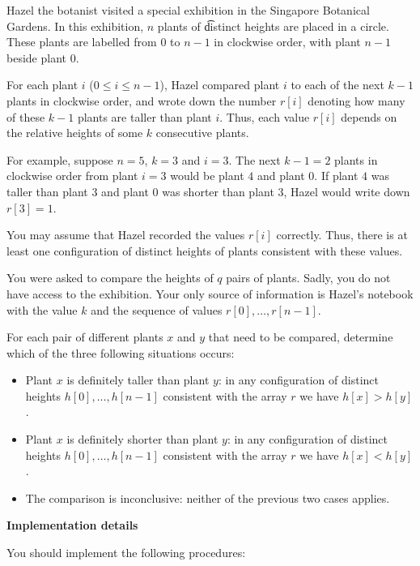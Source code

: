 Hazel the botanist visited a special exhibition in the Singapore Botanical Gardens. In this exhibition, $n$ plants of \t{distinct heights} are placed in a circle. These plants are labelled from $0$ to $n - 1$ in clockwise order, with plant $n-1$ beside plant $0$.

For each plant $i$ ($0 \leq i \leq n-1$), Hazel compared plant $i$ to each of the next $k-1$ plants in clockwise order, and wrote down the number $r[i]$ denoting how many of these $k-1$ plants are taller than plant $i$. Thus, each value $r[i]$ depends on the relative heights of some $k$ consecutive plants.

For example, suppose $n=5$, $k=3$ and $i=3$. The next $k-1 = 2$ plants in clockwise order from plant $i = 3$ would be plant $4$ and plant $0$. If plant $4$ was taller than plant $3$ and plant $0$ was shorter than plant $3$, Hazel would write down $r[3] = 1$.

You may assume that Hazel recorded the values $r[i]$ correctly. Thus, there is at least one configuration of distinct heights of plants consistent with these values.

You were asked to compare the heights of $q$ pairs of plants. Sadly, you do not have access to the exhibition. Your only source of information is Hazel's notebook with the value $k$ and the sequence of values $r[0], \ldots, r[n-1]$.

For each pair of different plants $x$ and $y$ that need to be compared, determine which of the three following situations occurs:

\begin{itemize}
\item  Plant $x$ is definitely taller than plant $y$: in any configuration of distinct heights $h[0], \ldots, h[n - 1]$ consistent with the array $r$ we have $h[x] > h[y]$.
\item  Plant $x$ is definitely shorter than plant $y$: in any configuration of distinct heights $h[0], \ldots, h[n - 1]$ consistent with the array $r$ we have $h[x] < h[y]$.
\item  The comparison is inconclusive: neither of the previous two cases applies.
\end{itemize}

\textbf{Implementation details}

You should implement the following procedures:

